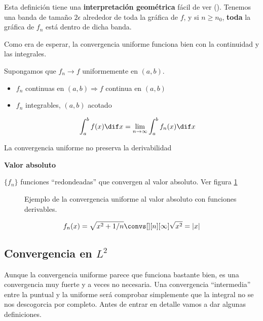 		Esta definición tiene una \textbf{interpretación geométrica} fácil de ver (). Tenemos una banda de tamaño $2\epsilon$ alrededor de toda la gráfica de $f$, y si $n \geq n_0$, {\bf toda} la gráfica de $f_n$ está dentro de dicha banda.

		Como era de esperar, la convergencia uniforme funciona bien con la continuidad y las integrales.

		\begin{theorem} \label{thm:ConvergenciaUniforme}

			Supongamos que $f_n \rightarrow f$ uniformemente en $(a,b)$.

			\begin{itemize}
				\item $f_n$ continuas en $(a,b) \Rightarrow f$ continua en $(a,b)$

				\item $f_n$ integrables, $(a,b)$ acotado

				\[\int^{b}_{a} f(x) \dif x = \lim_{n \rightarrow \infty} \int^{b}_{a} f_n(x) \dif x \]
			\end{itemize}

			\obs La convergencia uniforme no preserva la derivabilidad

		\end{theorem}

		\begin{example}{\bf Valor absoluto}

			$\{f_n\}$ funciones ``redondeadas'' que convergen al valor absoluto. Ver figura \ref{fig:convergenciaValorAbsoluto}

			\begin{figure}[thbp]
			\centering
			\caption{Ejemplo de la convergencia uniforme al valor absoluto con funciones derivables.}
			\label{fig:convergenciaValorAbsoluto}
			\end{figure}

			\[f_n(x) = \sqrt{x^2 + 1/n} \convs[][n][\infty] \sqrt{x^2} = |x| \]

		\end{example}

	\subsection{Convergencia en $L^2$}

		Aunque la convergencia uniforme parece que funciona bastante bien, es una convergencia muy fuerte y a veces no necesaria. Una convergencia ``intermedia'' entre la puntual y la uniforme será comprobar simplemente que la integral no se nos descogorcia por completo. Antes de entrar en detalle vamos a dar algunas definiciones.

